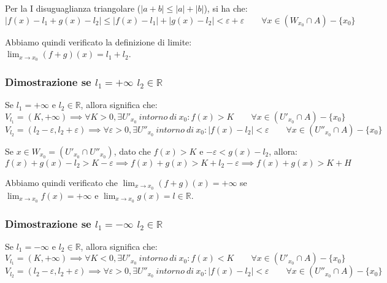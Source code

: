 \documentclass{article}
\begin{document}
\noindent Per la I disuguaglianza triangolare ($|a + b| \leq |a| + |b|$), si ha che:
\begin{equation*}
    |f(x) - l_1 + g(x) - l_2| \leq |f(x) - l_1| + |g(x) - l_2| < \varepsilon + \varepsilon \qquad \forall x \in (W_{x_0} \cap A) - \{x_0\}
\end{equation*}

\noindent Abbiamo quindi verificato la definizione di limite: $\lim_{x \to x_0} (f+g)(x) = l_1 + l_2$.

\subsubsection{Dimostrazione se $l_1 = +\infty$ $l_2 \in \mathbb{R}$}
Se $l_1 = +\infty$ e $l_2 \in \mathbb{R}$, allora significa che: 
\begin{equation*}
    V_{l_1} = (K, + \infty) \implies \forall K > 0, \exists U'_{x_0} \ intorno \ di \ x_0 : f(x) > K \qquad \forall x \in (U'_{x_0} \cap A) - \{x_0\}
\end{equation*}
\begin{equation*}
    V_{l_2} = (l_2 - \varepsilon, l_2 + \varepsilon) \implies \forall \varepsilon > 0, \exists U''_{x_0} \ intorno \ di \ x_0 : |f(x) - l_2| < \varepsilon \qquad \forall x \in (U''_{x_0} \cap A) - \{x_0\}
\end{equation*}

\noindent Se $x \in W_{x_0} = (U'_{x_0} \cap U''_{x_0})$, dato che $f(x) > K$ e $-\varepsilon < g(x) - l_2$, allora:
\begin{equation*}
    f(x) + g(x) - l_2 > K - \varepsilon \implies f(x) + g(x) > K + l_2 - \varepsilon \implies f(x) + g(x) > K + H
\end{equation*}

\noindent Abbiamo quindi verificato che $\lim_{x \to x_0} (f + g)(x) = +\infty$ se $\lim_{x \to x_0} f(x) = +\infty$ e $\lim_{x \to x_0} g(x) = l \in \mathbb{R}$.

\subsubsection{Dimostrazione se $l_1 = -\infty$ $l_2 \in \mathbb{R}$}
Se $l_1 = -\infty$ e $l_2 \in \mathbb{R}$, allora significa che: 
\begin{equation*}
    V_{l_1} = (K, + \infty) \implies \forall K < 0, \exists U'_{x_0} \ intorno \ di \ x_0 : f(x) < K \qquad \forall x \in (U'_{x_0} \cap A) - \{x_0\}
\end{equation*}
\begin{equation*}
    V_{l_2} = (l_2 - \varepsilon, l_2 + \varepsilon) \implies \forall \varepsilon > 0, \exists U''_{x_0} \ intorno \ di \ x_0 : |f(x) - l_2| < \varepsilon \qquad \forall x \in (U''_{x_0} \cap A) - \{x_0\}
\end{equation*}
\end{document}
